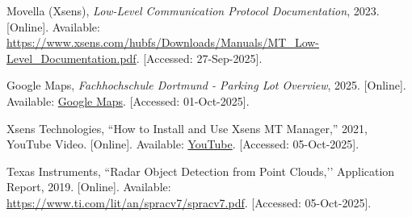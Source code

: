 \begin{thebibliography}{00}
Movella (Xsens),  
\textit{Low-Level Communication Protocol Documentation},  
2023. [Online]. Available: \url{https://www.xsens.com/hubfs/Downloads/Manuals/MT_Low-Level_Documentation.pdf}. [Accessed: 27-Sep-2025].  

Google Maps, 
\emph{Fachhochschule Dortmund - Parking Lot Overview}, 
2025. [Online]. Available: \href{https://www.google.com/maps/search/fh+dortmund/@51.5061964,7.4567,105m/data=!3m1!1e3?entry=ttu&g_ep=EgoyMDI1MDkyOC4wIKXMDSoASAFQAw%3D%3D}{Google Maps}. 
[Accessed: 01-Oct-2025].

Xsens Technologies, ``How to Install and Use Xsens MT Manager,'' 2021, YouTube Video. [Online]. Available: \href{https://www.youtube.com/watch?v=eg5tF_EgDeU}{YouTube}. [Accessed: 05-Oct-2025].

Texas Instruments, 
``Radar Object Detection from Point Clouds,’’ 
Application Report, 2019. 
[Online]. Available: \url{https://www.ti.com/lit/an/spracv7/spracv7.pdf}. 
[Accessed: 05-Oct-2025].


\end{thebibliography}